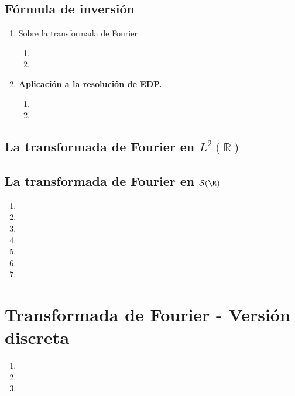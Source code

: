 \documentclass{article}
\begin{document}
\subsection{Fórmula de inversión}
\begin{enumerate}
    \item Sobre la transformada de Fourier
    \begin{enumerate}
        \item 
        \item 
    \end{enumerate}
    \item\textbf{Aplicación a la resolución de EDP.}
    \begin{enumerate}
        \item 
        \item 
    \end{enumerate}
\end{enumerate}

\subsection{La transformada de Fourier en \texorpdfstring{$L^{2}(\mathbb{R})$}{}}



\subsection{La transformada de Fourier en \texorpdfstring{$\mathcal{S}(\R)$}{}}
\begin{enumerate}
    \item 
    \item 
    \item 
    \item 
    \item 
    \item 
    \item 
\end{enumerate}

\section{Transformada de Fourier - Versión discreta}
\begin{enumerate}
    \item 
    \item 
    \item 
\end{enumerate}

\end{document}
